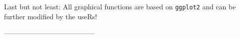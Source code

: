 \documentclass[a0,landscape]{a0poster}
\begin{document}
\begin{multicols*}{3}
\vspace{5mm}

\textcolor{title}{Last but not least:} All graphical functions are based on \texttt{ggplot2} \cite{ggplot2} and can be further modified by the useRs! 

\vspace{5mm}
---------------------------------------
\footnotesize


\end{multicols*}
\end{document}
